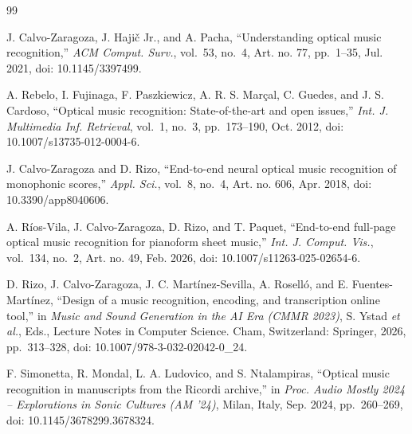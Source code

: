 \documentclass[conference]{IEEEtran}
\begin{document}
\begin{thebibliography}{99}

J. Calvo-Zaragoza, J. Haji\v{c} Jr., and A. Pacha, ``Understanding optical
music recognition,'' \emph{ACM Comput. Surv.}, vol.~53, no.~4, Art. no. 77,
pp.~1--35, Jul. 2021, doi: 10.1145/3397499. %

A. Rebelo, I. Fujinaga, F. Paszkiewicz, A. R. S. Mar\c{c}al, C. Guedes, and
J. S. Cardoso, ``Optical music recognition: State-of-the-art and open
issues,'' \emph{Int. J. Multimedia Inf. Retrieval}, vol.~1, no.~3,
pp.~173--190, Oct. 2012, doi: 10.1007/s13735-012-0004-6. %

J. Calvo-Zaragoza and D. Rizo, ``End-to-end neural optical music
recognition of monophonic scores,'' \emph{Appl. Sci.}, vol.~8, no.~4,
Art. no. 606, Apr. 2018, doi: 10.3390/app8040606. %

A. R\'ios-Vila, J. Calvo-Zaragoza, D. Rizo, and T. Paquet, ``End-to-end
full-page optical music recognition for pianoform sheet music,'' \emph{Int. J.
Comput. Vis.}, vol.~134, no.~2, Art. no. 49, Feb. 2026,
doi: 10.1007/s11263-025-02654-6. %

D. Rizo, J. Calvo-Zaragoza, J. C. Mart\'inez-Sevilla, A. Rosell\'o, and
E. Fuentes-Mart\'inez, ``Design of a music recognition, encoding, and
transcription online tool,'' in \emph{Music and Sound Generation in the AI
Era (CMMR 2023)}, S. Ystad \emph{et al.}, Eds., Lecture Notes in Computer
Science. Cham, Switzerland: Springer, 2026, pp.~313--328,
doi: 10.1007/978-3-032-02042-0\_24. %

F. Simonetta, R. Mondal, L. A. Ludovico, and S. Ntalampiras, ``Optical music
recognition in manuscripts from the Ricordi archive,'' in \emph{Proc. Audio
Mostly 2024 -- Explorations in Sonic Cultures (AM '24)}, Milan, Italy,
Sep. 2024, pp.~260--269, doi: 10.1145/3678299.3678324. %


\end{thebibliography}
\end{document}
